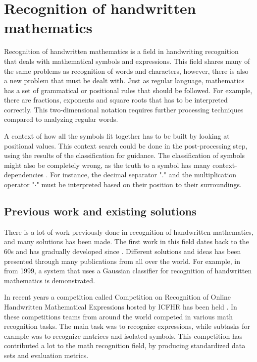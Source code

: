\section{Recognition of handwritten mathematics} 
\label{recognition_of_handwritten_mathematics}
Recognition of handwritten mathematics is a field in handwriting recognition that deals with mathematical symbols and expressions. This field shares many of the same problems as recognition of words and characters, however, there is also a new problem that must be dealt with. Just as regular language, mathematics has a set of grammatical or positional rules that should be followed. For example, there are fractions, exponents and square roots that has to be interpreted correctly. This two-dimensional notation requires further processing techniques compared to analyzing regular words.

A context of how all the symbols fit together has to be built by looking at positional values. This context search could be done in the post-processing step, using the results of the classification for guidance. The classification of symbols might also be completely wrong, as the truth to a symbol has many context-dependencies \cite{zanibbi_recognition_2012}. For instance, the decimal separator "." and the multiplication operator "$\cdot$" must be interpreted based on their position to their surroundings.


\subsection{Previous work and existing solutions}
\label{previous_work_existing_solutions}
There is a lot of work previously done in recognition of handwritten mathematics, and many solutions has been made. The first work in this field dates back to the 60s and has gradually developed since \cite{mouchere_icfhr2016_2016}. Different solutions and ideas has been presented through many publications from all over the world. For example, in \cite{matsakis_recognition_????} from 1999, a system that uses a Gaussian classifier for recognition of handwritten mathematics is demonstrated.

In recent years a competition called Competition on Recognition of Online Handwritten Mathematical Expressions hosted by ICFHR has been held \cite{mouchere_icfhr2016_2016} \cite{mouchere_advancing_2016}. In these competitions teams from around the world competed in various math recognition tasks. The main task was to recognize expressions, while subtasks for example was to recognize matrices and isolated symbols. This competition has contributed a lot to the math recognition field, by producing standardized data sets and evaluation metrics.

